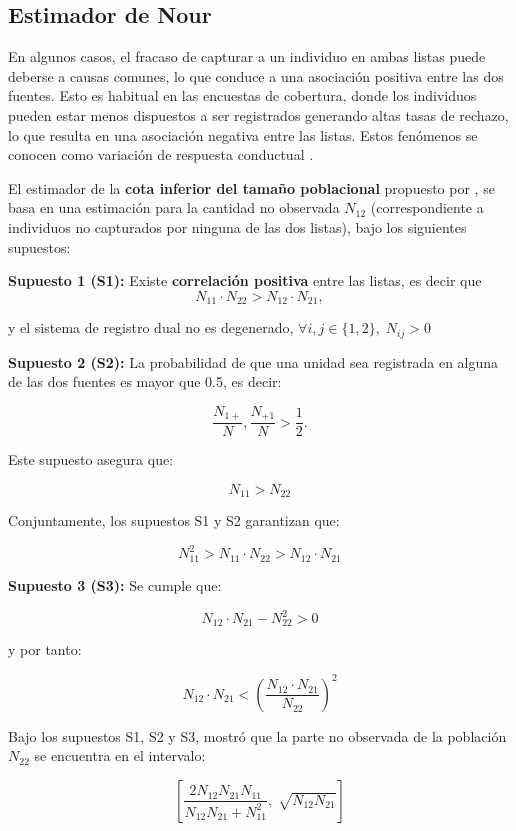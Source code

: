 \documentclass[
  12pt,
]{book}
\begin{document}
\subsection{Estimador de Nour}\label{estimador-de-nour}

En algunos casos, el fracaso de capturar a un individuo en ambas listas puede deberse a causas comunes, lo que conduce a una asociación positiva entre las dos fuentes. Esto es habitual en las encuestas de cobertura, donde los individuos pueden estar menos dispuestos a ser registrados generando altas tasas de rechazo, lo que resulta en una asociación negativa entre las listas. Estos fenómenos se conocen como variación de respuesta conductual \citep{wolter1986coverage} .

El estimador de la \textbf{cota inferior del tamaño poblacional} propuesto por \citet{nour1982estimation}, se basa en una estimación para la cantidad no observada \(N_{12}\) (correspondiente a individuos no capturados por ninguna de las dos listas), bajo los siguientes supuestos:

\textbf{Supuesto 1 (S1):} Existe \textbf{correlación positiva} entre las listas, es decir que \[N_{11} \cdot N_{22} > N_{12} \cdot N_{21},\]

y el sistema de registro dual no es degenerado, \(\forall i, j \in \{1, 2\}, \; N_{ij} > 0\)

\textbf{Supuesto 2 (S2):} La probabilidad de que una unidad sea registrada en alguna de las dos fuentes es mayor que 0.5, es decir:

\[\frac{N_{1+}}{N}, \frac{N_{+1}}{N} > \frac{1}{2}.\]

Este supuesto asegura que:

\[N_{11} > N_{22}\]

Conjuntamente, los supuestos S1 y S2 garantizan que:

\[N_{11}^2 > N_{11} \cdot N_{22} > N_{12} \cdot N_{21}\]

\textbf{Supuesto 3 (S3):} Se cumple que:

\[N_{12} \cdot N_{21} - N_{22}^2 > 0\]

y por tanto:

\[N_{12} \cdot N_{21} < \left( \frac{N_{12} \cdot N_{21}}{N_{22}} \right)^2\]

Bajo los supuestos S1, S2 y S3, \citet{nour1982estimation} mostró que la parte no observada de la población \(N_{22}\) se encuentra en el intervalo:

\[\left[ \frac{2 N_{12} N_{21} N_{11}}{N_{12} N_{21} + N_{11}^2}, \; \sqrt{N_{12} N_{21}} \right]\]
\end{document}
